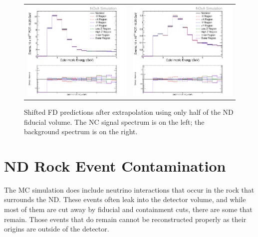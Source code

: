 \begin{figure}[htb]
  \centering
  \begin{tabular}{c c}
    \includegraphics[width=.47\textwidth]{figures/Systs/cNCEXFidContSysts.png} &
    \includegraphics[width=.47\linewidth]{figures/Systs/cBGEXFidContSysts.png} \\
  \end{tabular}
  \caption[Shifted FD Predictions from Extrapolation of Halves of the ND]{Shifted FD predictions after extrapolation using only half of the ND fiducial volume. The NC signal spectrum is on the left; the background spectrum is on the right.}
  \label{fig:SystFidCont}
\end{figure}

\section{ND Rock Event Contamination}
\label{sec:SystNDRock}

The MC simulation does include neutrino interactions that occur in the rock that surrounds the ND. These events often leak into the detector volume, and while most of them are cut away by fiducial and containment cuts, there are some that remain. Those events that do remain cannot be reconstructed properly as their origins are outside of the detector. 

